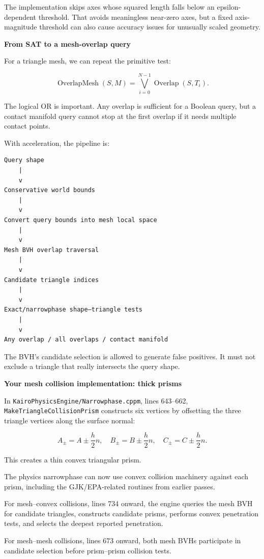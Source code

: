 The implementation skips axes whose squared length falls below an epsilon-dependent threshold. That avoids meaningless near-zero axes, but a fixed axis-magnitude threshold can also cause accuracy issues for unusually scaled geometry.

\textbf{From SAT to a mesh-overlap query}

For a triangle mesh, we can repeat the primitive test:

\[
\operatorname{OverlapMesh}(S,M) = \bigvee_{i=0}^{N-1}\operatorname{Overlap}(S,T_i).
\]

The logical OR is important. Any overlap is sufficient for a Boolean query, but a contact manifold query cannot stop at the first overlap if it needs multiple contact points.

With acceleration, the pipeline is:

\begin{verbatim}
Query shape
    |
    v
Conservative world bounds
    |
    v
Convert query bounds into mesh local space
    |
    v
Mesh BVH overlap traversal
    |
    v
Candidate triangle indices
    |
    v
Exact/narrowphase shape–triangle tests
    |
    v
Any overlap / all overlaps / contact manifold
\end{verbatim}

The BVH's candidate selection is allowed to generate false positives. It must not exclude a triangle that really intersects the query shape.

\textbf{Your mesh collision implementation: thick prisms}

In \texttt{KairoPhysicsEngine/Narrowphase.cppm}, lines 643--662, \texttt{MakeTriangleCollisionPrism} constructs six vertices by offsetting the three triangle vertices along the surface normal:

\[
A_\pm=A\pm\frac{h}{2}n,\quad B_\pm=B\pm\frac{h}{2}n,\quad C_\pm=C\pm\frac{h}{2}n.
\]

This creates a thin convex triangular prism.

The physics narrowphase can now use convex collision machinery against each prism, including the GJK/EPA-related routines from earlier passes.

For mesh--convex collisions, lines 734 onward, the engine queries the mesh BVH for candidate triangles, constructs candidate prisms, performs convex penetration tests, and selects the deepest reported penetration.

For mesh--mesh collisions, lines 673 onward, both mesh BVHs participate in candidate selection before prism--prism collision tests.

